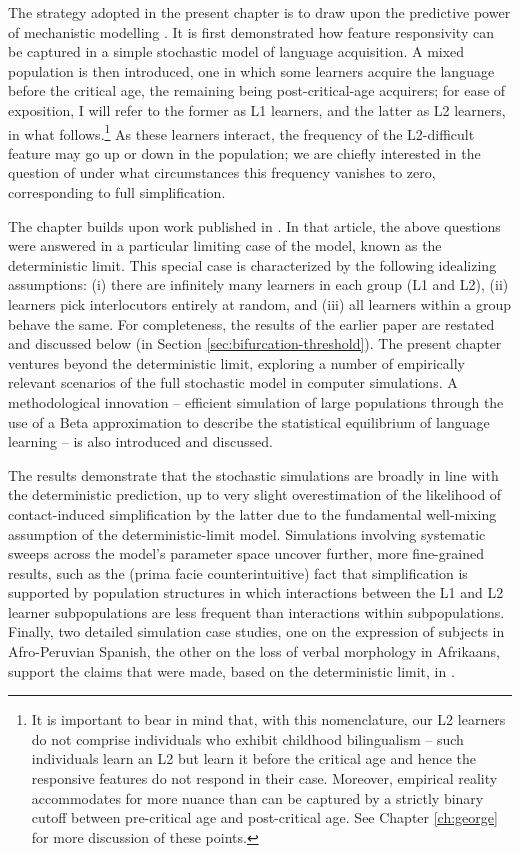 The strategy adopted in the present chapter is to draw upon the
predictive power of mechanistic modelling \autocite{GeritzKisdi2012}. It
is first demonstrated how feature responsivity can be captured in a
simple stochastic model of language acquisition. A mixed population is
then introduced, one in which some learners acquire the language before
the critical age, the remaining being post-critical-age acquirers; for
ease of exposition, I will refer to the former as L1 learners, and the
latter as L2 learners, in what follows.\footnote{It is important to bear
  in mind that, with this nomenclature, our L2 learners do not comprise
  individuals who exhibit childhood bilingualism -- such individuals
  learn an L2 but learn it before the critical age and hence the
  responsive features do not respond in their case. Moreover, empirical
  reality accommodates for more nuance than can be captured by a
  strictly binary cutoff between pre-critical age and post-critical age.
  See Chapter \ref{ch:george} for more discussion of these points.} As
these learners interact, the frequency of the L2-difficult feature may
go up or down in the population; we are chiefly interested in the
question of under what circumstances this frequency vanishes to zero,
corresponding to full simplification.

The chapter builds upon work published in \textcite{Kauhanen2022}. In
that article, the above questions were answered in a particular limiting
case of the model, known as the deterministic limit. This special case
is characterized by the following idealizing assumptions: (i) there are
infinitely many learners in each group (L1 and L2), (ii) learners pick
interlocutors entirely at random, and (iii) all learners within a group
behave the same. For completeness, the results of the earlier paper are
restated and discussed below (in Section
\ref{sec:bifurcation-threshold}). The present chapter ventures beyond
the deterministic limit, exploring a number of empirically relevant
scenarios of the full stochastic model in computer simulations. A
methodological innovation -- efficient simulation of large populations
through the use of a Beta approximation to describe the statistical
equilibrium of language learning -- is also introduced and discussed.

The results demonstrate that the stochastic simulations are broadly in
line with the deterministic prediction, up to very slight overestimation
of the likelihood of contact-induced simplification by the latter due to
the fundamental well-mixing assumption of the deterministic-limit model.
Simulations involving systematic sweeps across the model's parameter
space uncover further, more fine-grained results, such as the (prima
facie counterintuitive) fact that simplification is supported by
population structures in which interactions between the L1 and L2
learner subpopulations are less frequent than interactions within
subpopulations. Finally, two detailed simulation case studies, one on
the expression of subjects in Afro-Peruvian Spanish, the other on the
loss of verbal morphology in Afrikaans, support the claims that were
made, based on the deterministic limit, in \textcite{Kauhanen2022}.

